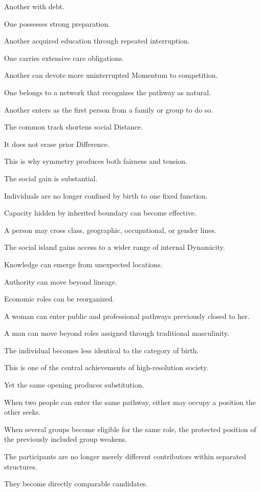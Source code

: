 Another with debt.

One possesses strong preparation.

Another acquired education through repeated interruption.

One carries extensive care obligations.

Another can devote more uninterrupted Momentum to competition.

One belongs to a network that recognizes the pathway as natural.

Another enters as the first person from a family or group to do so.

The common track shortens social Distance.

It does not erase prior Difference.

This is why symmetry produces both fairness and tension.

The social gain is substantial.

Individuals are no longer confined by birth to one fixed function.

Capacity hidden by inherited boundary can become effective.

A person may cross class, geographic, occupational, or gender lines.

The social island gains access to a wider range of internal Dynamicity.

Knowledge can emerge from unexpected locations.

Authority can move beyond lineage.

Economic roles can be reorganized.

A woman can enter public and professional pathways previously closed to her.

A man can move beyond roles assigned through traditional masculinity.

The individual becomes less identical to the category of birth.

This is one of the central achievements of high-resolution society.

Yet the same opening produces substitution.

When two people can enter the same pathway, either may occupy a position the other seeks.

When several groups become eligible for the same role, the protected position of the previously included group weakens.

The participants are no longer merely different contributors within separated structures.

They become directly comparable candidates.

